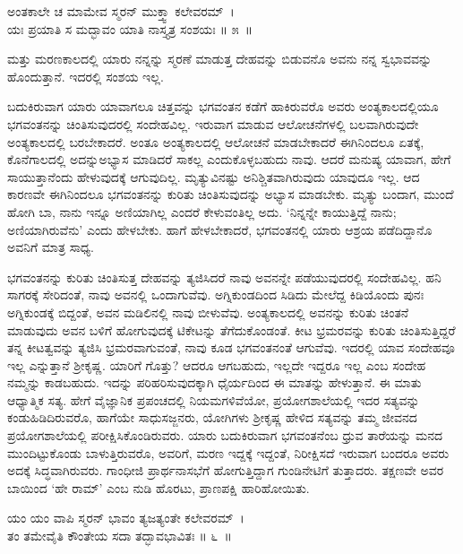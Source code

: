 \begin{shloka}
ಅಂತಕಾಲೇ ಚ ಮಾಮೇವ ಸ್ಮರನ್ ಮುಕ್ತ್ವಾ ಕಲೇವರಮ್~।\\ಯಃ ಪ್ರಯಾತಿ ಸ ಮದ್ಭಾವಂ ಯಾತಿ ನಾಸ್ತ್ಯತ್ರ ಸಂಶಯಃ \hfill॥ ೫~॥
\end{shloka}

\begin{artha}
ಮತ್ತು ಮರಣಕಾಲದಲ್ಲಿ ಯಾರು ನನ್ನನ್ನು ಸ್ಮರಣೆ ಮಾಡುತ್ತ ದೇಹವನ್ನು ಬಿಡುವನೊ ಅವನು ನನ್ನ ಸ್ವಭಾವವನ್ನು ಹೊಂದುತ್ತಾನೆ. ಇದರಲ್ಲಿ ಸಂಶಯ ಇಲ್ಲ.
\end{artha}

ಬದುಕಿರುವಾಗ ಯಾರು ಯಾವಾಗಲೂ ಚಿತ್ತವನ್ನು ಭಗವಂತನ ಕಡೆಗೆ ಹಾಕಿರುವರೊ ಅವರು ಅಂತ್ಯಕಾಲದಲ್ಲಿಯೂ ಭಗವಂತನನ್ನು ಚಿಂತಿಸುವುದರಲ್ಲಿ ಸಂದೇಹವಿಲ್ಲ. ಇರುವಾಗ ಮಾಡುವ ಆಲೋಚನೆಗಳಲ್ಲಿ ಬಲವಾಗಿರುವುದೇ ಅಂತ್ಯಕಾಲದಲ್ಲಿ ಬರಬೇಕಾದರೆ. ಅಂತೂ ಅಂತ್ಯಕಾಲದಲ್ಲಿ ಆಲೋಚನೆ ಮಾಡಬೇಕಾದರೆ ಈಗಿನಿಂದಲೂ ಏತಕ್ಕೆ, ಕೊನೆಗಾಲದಲ್ಲಿ ಅದನ್ನುಅಭ್ಯಾಸ ಮಾಡಿದರೆ ಸಾಕಲ್ಲ ಎಂದುಕೊಳ್ಳಬಹುದು ನಾವು. ಆದರೆ ಮನುಷ್ಯ ಯಾವಾಗ, ಹೇಗೆ ಸಾಯುತ್ತಾನೆಂದು ಹೇಳುವುದಕ್ಕೆ ಆಗುವುದಿಲ್ಲ. ಮೃತ್ಯುವಿನಷ್ಟು ಅನಿಶ್ಚಿತವಾಗಿರುವುದು ಯಾವುದೂ ಇಲ್ಲ. ಆದ ಕಾರಣವೇ ಈಗಿನಿಂದಲೂ ಭಗವಂತನನ್ನು ಕುರಿತು ಚಿಂತಿಸುವುದನ್ನು ಅಭ್ಯಾಸ ಮಾಡಬೇಕು. ಮೃತ್ಯು ಬಂದಾಗ, ಮುಂದೆ ಹೋಗಿ ಬಾ, ನಾನು ಇನ್ನೂ ಅಣಿಯಾಗಿಲ್ಲ ಎಂದರೆ ಕೇಳು\-ವಂತಿಲ್ಲ ಅದು. ‘ನಿನ್ನನ್ನೇ ಕಾಯುತ್ತಿದ್ದೆ ನಾನು; ಅಣಿಯಾಗಿರುವೆನು’ ಎಂದು ಹೇಳಬೇಕು. ಹಾಗೆ ಹೇಳಬೇಕಾದರೆ, ಭಗವಂತನಲ್ಲಿ ಯಾರು ಆಶ್ರಯ ಪಡೆದಿದ್ದಾನೊ ಅವನಿಗೆ ಮಾತ್ರ ಸಾಧ್ಯ.

ಭಗವಂತನನ್ನು ಕುರಿತು ಚಿಂತಿಸುತ್ತ ದೇಹವನ್ನು ತ್ಯಜಿಸಿದರೆ ನಾವು ಅವನನ್ನೇ ಪಡೆಯುವುದರಲ್ಲಿ ಸಂದೇಹವಿಲ್ಲ. ಹನಿ ಸಾಗರಕ್ಕೆ ಸೇರಿದಂತೆ, ನಾವು ಅವನಲ್ಲಿ ಒಂದಾಗುವೆವು. ಅಗ್ನಿಕುಂಡದಿಂದ ಸಿಡಿದು ಮೇಲೆದ್ದ ಕಿಡಿಯೊಂದು ಪುನಃ ಅಗ್ನಿಕುಂಡಕ್ಕೆ ಬಿದ್ದಂತೆ, ಅವನ ಮಡಿಲಿನಲ್ಲಿ ನಾವು ಬೀಳುವೆವು. ಅಂತ್ಯಕಾಲದಲ್ಲಿ ಅವನನ್ನು ಕುರಿತು ಚಿಂತನೆ ಮಾಡುವುದು ಅವನ ಬಳಿಗೆ ಹೋಗುವುದಕ್ಕೆ ಟಿಕೇಟನ್ನು ತೆಗೆದುಕೊಂಡಂತೆ. ಕೀಟ ಭ್ರಮರವನ್ನು ಕುರಿತು ಚಿಂತಿಸುತ್ತಿದ್ದರೆ ತನ್ನ ಕೀಟತ್ವವನ್ನು ತ್ಯಜಿಸಿ ಭ್ರಮರವಾಗುವಂತೆ, ನಾವು ಕೂಡ ಭಗವಂತನಂತೆ ಆಗುವೆವು. ಇದರಲ್ಲಿ ಯಾವ ಸಂದೇಹವೂ ಇಲ್ಲ ಎನ್ನುತ್ತಾನೆ ಶ‍್ರೀಕೃಷ್ಣ. ಯಾರಿಗೆ ಗೊತ್ತು? ಆದರೂ ಆಗಬಹುದು, ಇಲ್ಲದೇ ಇದ್ದರೂ ಇಲ್ಲ ಎಂಬ ಸಂದೇಹ ನಮ್ಮನ್ನು ಕಾಡಬಹುದು. ಇದನ್ನು ಪರಿಹರಿಸುವುದಕ್ಕಾಗಿ ಧೈರ್ಯದಿಂದ ಈ ಮಾತನ್ನು ಹೇಳುತ್ತಾನೆ. ಈ ಮಾತು ಆಧ್ಯಾತ್ಮಿಕ ಸತ್ಯ. ಹೇಗೆ ವೈಜ್ಞಾನಿಕ ಪ್ರಪಂಚದಲ್ಲಿ ನಿಯಮಗಳಿವೆಯೋ, ಪ್ರಯೋಗಶಾಲೆಯಲ್ಲಿ ಇದರ ಸತ್ಯವನ್ನು ಕಂಡುಹಿಡಿದಿರುವರೊ, ಹಾಗೆಯೇ ಸಾಧುಸಜ್ಜನರು, ಯೋಗಿಗಳು ಶ‍್ರೀಕೃಷ್ಣ ಹೇಳಿದ ಸತ್ಯವನ್ನು ತಮ್ಮ ಜೀವನದ ಪ್ರಯೋಗಶಾಲೆಯಲ್ಲಿ ಪರೀಕ್ಷಿಸಿಕೊಂಡಿರುವರು. ಯಾರು ಬದುಕಿರುವಾಗ ಭಗವಂತನೆಂಬ ಧ್ರುವ ತಾರೆಯನ್ನು ಮನದ ಮುಂದಿಟ್ಟುಕೊಂಡು ಬಾಳುತ್ತಿರುವರೊ, ಅವರಿಗೆ, ಮರಣ ಇದ್ದಕ್ಕೆ ಇದ್ದಂತೆ, ನಿರೀಕ್ಷಿಸದೆ ಇರುವಾಗ ಬಂದರೂ ಅವರು ಅದಕ್ಕೆ ಸಿದ್ಧವಾಗಿರುವರು. ಗಾಂಧೀಜಿ ಪ್ರಾರ್ಥನಾಸಭೆಗೆ ಹೋಗುತ್ತಿದ್ದಾಗ ಗುಂಡಿನೇಟಿಗೆ ತುತ್ತಾದರು. ತಕ್ಷಣವೇ ಅವರ ಬಾಯಿಂದ ‘ಹೇ ರಾಮ್​’ ಎಂಬ ನುಡಿ ಹೊರಟು, ಪ್ರಾಣಪಕ್ಷಿ ಹಾರಿಹೋಯಿತು.

\begin{shloka}
ಯಂ ಯಂ ವಾಪಿ ಸ್ಮರನ್ ಭಾವಂ ತ್ಯಜತ್ಯಂತೇ ಕಲೇವರಮ್~।\\ತಂ ತಮೇವೈತಿ ಕೌಂತೇಯ ಸದಾ ತದ್ಭಾವಭಾವಿತಃ \hfill॥ ೬~॥
\end{shloka}

